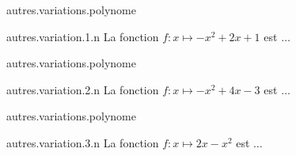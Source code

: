 \begin{qcm}{autres.variations.polynome}
    \begin{question}{autres.variation.1.n}
        La fonction $f\colon x\mapsto -x^2+2x+1$ est $\ldots$
        \vspace{0.1cm}
        \begin{reponses}
            \bonne{décroissante sur $]1,+\infty[$}
            \mauvaise{strictement croissante sur $]1,+\infty[$}
            \mauvaise{croissante sur $[1,+\infty[$}
        \end{reponses}
        \vspace{0.4cm}
    \end{question}
\end{qcm}


\begin{qcm}{autres.variations.polynome}
    \begin{question}{autres.variation.2.n}
        La fonction $f\colon  x\mapsto -x^2+4x-3$ est $\ldots$
        \vspace{0.1cm}
        \begin{reponses}
            \bonne{décroissante sur $]2,+\infty[$}
            \mauvaise{strictement croissante sur $]2,+\infty[$}
            \mauvaise{croissante sur $[2,+\infty[$}
        \end{reponses}
        \vspace{0.4cm}
    \end{question}
\end{qcm}


\begin{qcm}{autres.variations.polynome}
    \begin{question}{autres.variation.3.n}
        La fonction $f\colon  x\mapsto 2x-x^2$ est $\ldots$
        \vspace{0.1cm}
        \begin{reponses}
            \bonne{décroissante sur $]1,+\infty[$}
            \mauvaise{strictement croissante sur $]1,+\infty[$}
            \mauvaise{croissante sur $[1,+\infty[$}
            \mauvaise{strictement décroissante sur $]0,+\infty[$}
        \end{reponses}
        \vspace{0.4cm}
    \end{question}
\end{qcm}
